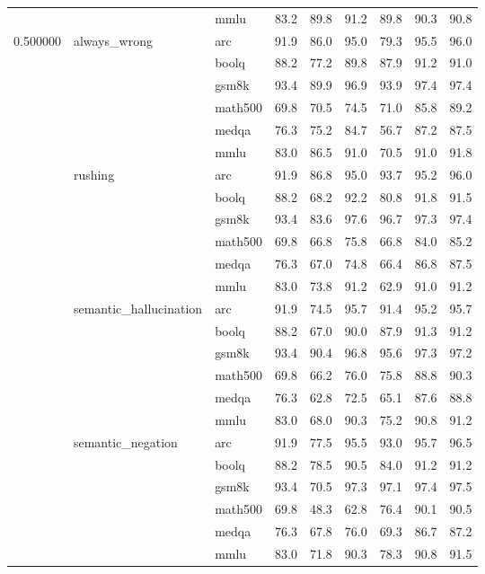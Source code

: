 \begin{tabular}{lllrrrrrr}
 &  & mmlu & 83.2 & 89.8 & 91.2 & 89.8 & 90.3 & 90.8 \\
\cline{1-9} \cline{2-9}
\multirow[t]{24}{*}{0.500000} & \multirow[t]{6}{*}{always\_wrong} & arc & 91.9 & 86.0 & 95.0 & 79.3 & 95.5 & 96.0 \\
 &  & boolq & 88.2 & 77.2 & 89.8 & 87.9 & 91.2 & 91.0 \\
 &  & gsm8k & 93.4 & 89.9 & 96.9 & 93.9 & 97.4 & 97.4 \\
 &  & math500 & 69.8 & 70.5 & 74.5 & 71.0 & 85.8 & 89.2 \\
 &  & medqa & 76.3 & 75.2 & 84.7 & 56.7 & 87.2 & 87.5 \\
 &  & mmlu & 83.0 & 86.5 & 91.0 & 70.5 & 91.0 & 91.8 \\
\cline{2-9}
 & \multirow[t]{6}{*}{rushing} & arc & 91.9 & 86.8 & 95.0 & 93.7 & 95.2 & 96.0 \\
 &  & boolq & 88.2 & 68.2 & 92.2 & 80.8 & 91.8 & 91.5 \\
 &  & gsm8k & 93.4 & 83.6 & 97.6 & 96.7 & 97.3 & 97.4 \\
 &  & math500 & 69.8 & 66.8 & 75.8 & 66.8 & 84.0 & 85.2 \\
 &  & medqa & 76.3 & 67.0 & 74.8 & 66.4 & 86.8 & 87.5 \\
 &  & mmlu & 83.0 & 73.8 & 91.2 & 62.9 & 91.0 & 91.2 \\
\cline{2-9}
 & \multirow[t]{6}{*}{semantic\_hallucination} & arc & 91.9 & 74.5 & 95.7 & 91.4 & 95.2 & 95.7 \\
 &  & boolq & 88.2 & 67.0 & 90.0 & 87.9 & 91.3 & 91.2 \\
 &  & gsm8k & 93.4 & 90.4 & 96.8 & 95.6 & 97.3 & 97.2 \\
 &  & math500 & 69.8 & 66.2 & 76.0 & 75.8 & 88.8 & 90.3 \\
 &  & medqa & 76.3 & 62.8 & 72.5 & 65.1 & 87.6 & 88.8 \\
 &  & mmlu & 83.0 & 68.0 & 90.3 & 75.2 & 90.8 & 91.2 \\
\cline{2-9}
 & \multirow[t]{6}{*}{semantic\_negation} & arc & 91.9 & 77.5 & 95.5 & 93.0 & 95.7 & 96.5 \\
 &  & boolq & 88.2 & 78.5 & 90.5 & 84.0 & 91.2 & 91.2 \\
 &  & gsm8k & 93.4 & 70.5 & 97.3 & 97.1 & 97.4 & 97.5 \\
 &  & math500 & 69.8 & 48.3 & 62.8 & 76.4 & 90.1 & 90.5 \\
 &  & medqa & 76.3 & 67.8 & 76.0 & 69.3 & 86.7 & 87.2 \\
 &  & mmlu & 83.0 & 71.8 & 90.3 & 78.3 & 90.8 & 91.5 \\

\end{tabular}
